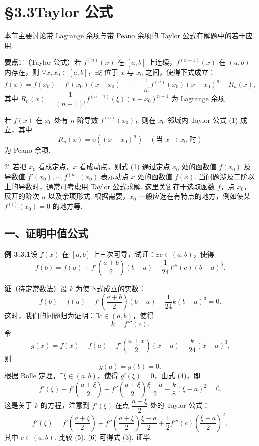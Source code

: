 \documentclass[UTF8,12pt,a4paper,fontset=fandol]{ctexart}
\begin{document}
\section*{§3.3\quad Taylor 公式}

本节主要讨论带 Lagrange 余项与带 Peano 余项的 Taylor 公式在解题中的若干应用.

\noindent\textbf{要点}\quad $1^\circ$（Taylor 公式）若 $f^{(n)}(x)$ 在 $[a,b]$ 上连续，$f^{(n+1)}(x)$ 在 $(a,b)$ 内存在，则 $\forall x,x_0\in[a,b]$，$\exists \xi$ 位于 $x$ 与 $x_0$ 之间，使得下式成立：
\begin{equation}
  f(x)=f(x_0)+f'(x_0)(x-x_0)+\cdots+\frac1{n!}f^{(n)}(x_0)(x-x_0)^n+R_n(x),
\tag{1}
\end{equation}
其中 $R_n(x)=\dfrac1{(n+1)!}f^{(n+1)}(\xi)(x-x_0)^{n+1}$ 为 Lagrange 余项.

若 $f(x)$ 在 $x_0$ 处有 $n$ 阶导数 $f^{(n)}(x_0)$，则在 $x_0$ 邻域内 Taylor 公式 (1) 成立，其中
\[
  R_n(x)=o((x-x_0)^n)\quad(\text{当 }x\to x_0\text{ 时})
\]
为 Peano 余项.

$2^\circ$ 若把 $x_0$ 看成定点，$x$ 看成动点，则式 (1) 通过定点 $x_0$ 处的函数值 $f(x_0)$ 及导数值 $f'(x_0),\cdots,f^{(n)}(x_0)$ 表示动点 $x$ 处的函数值 $f(x)$. 当问题涉及二阶以上的导数时，通常可考虑用 Taylor 公式求解. 这里关键在于选取函数 $f$，点 $x_0$，展开的阶次 $n$ 以及余项形式. 根据需要，$x_0$ 一般应选在有特点的地方，例如使某 $f^{(i)}(x_0)=0$ 的地方等.

\subsection*{一、证明中值公式}

\noindent\textbf{例 3.3.1}\quad 设 $f(x)$ 在 $[a,b]$ 上三次可导，试证：$\exists c\in(a,b)$，使得
\begin{equation}
  f(b)=f(a)+f'\left(\frac{a+b}{2}\right)(b-a)+\frac1{24}f'''(c)(b-a)^3.
\tag{1}
\end{equation}

\noindent\textbf{证}\quad （待定常数法）设 $k$ 为使下式成立的实数：
\begin{equation}
  f(b)-f(a)-f'\left(\frac{a+b}{2}\right)(b-a)-\frac1{24}k(b-a)^3=0.
\tag{2}
\end{equation}
这时，我们的问题归为证明：$\exists c\in(a,b)$，使得
\begin{equation}
  k=f'''(c).
\tag{3}
\end{equation}
令
\begin{equation}
  g(x)=f(x)-f(a)-f'\left(\frac{a+x}{2}\right)(x-a)-\frac{k}{24}(x-a)^3.
\tag{4}
\end{equation}
则
\[
  g(a)=g(b)=0.
\]
根据 Rolle 定理，$\exists \xi\in(a,b)$，使得 $g'(\xi)=0$，由式 (4)，即
\begin{equation}
  f'(\xi)-f'\left(\frac{a+\xi}{2}\right)-f''\left(\frac{a+\xi}{2}\right)\frac{\xi-a}{2}
  -\frac{k}{8}(\xi-a)^2=0.
\tag{5}
\end{equation}
这是关于 $k$ 的方程，注意到 $f'(\xi)$ 在点 $\dfrac{a+\xi}{2}$ 处的 Taylor 公式：
\[
  f'(\xi)=f'\left(\frac{a+\xi}{2}\right)
  +f''\left(\frac{a+\xi}{2}\right)\frac{\xi-a}{2}
  +\frac12f'''(c)\left(\frac{\xi-a}{2}\right)^2,
\tag{6}
\]
其中 $c\in(a,b)$. 比较 (5), (6) 可得式 (3). 证毕.
\end{document}
